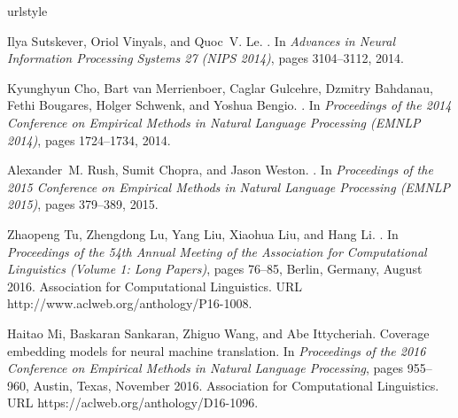\documentclass[11pt]{article}
\begin{document}
\begin{thebibliography}{23}
\providecommand{\natexlab}[1]{#1}
\providecommand{\url}[1]{{#1}}
\expandafter\ifx\csname urlstyle\endcsname\relax
  \providecommand{\doi}[1]{doi: #1}\else
  \providecommand{\doi}{doi: \begingroup \urlstyle{rm}\Url}\fi

Ilya Sutskever, Oriol Vinyals, and Quoc~V. Le.
.
\newblock In \emph{Advances in Neural Information Processing Systems 27 (NIPS
  2014)}, pages 3104--3112, 2014.

Kyunghyun Cho, Bart van Merrienboer, Caglar Gulcehre, Dzmitry Bahdanau, Fethi
  Bougares, Holger Schwenk, and Yoshua Bengio.
.
\newblock In \emph{Proceedings of the 2014 Conference on Empirical Methods in
  Natural Language Processing (EMNLP 2014)}, pages 1724--1734, 2014.

Alexander~M. Rush, Sumit Chopra, and Jason Weston.
.
\newblock In \emph{Proceedings of the 2015 Conference on Empirical Methods in
  Natural Language Processing (EMNLP 2015)}, pages 379--389, 2015.

Zhaopeng Tu, Zhengdong Lu, Yang Liu, Xiaohua Liu, and Hang Li.
.
\newblock In \emph{Proceedings of the 54th Annual Meeting of the Association
  for Computational Linguistics (Volume 1: Long Papers)}, pages 76--85, Berlin,
  Germany, August 2016. Association for Computational Linguistics.
\newblock URL \url{http://www.aclweb.org/anthology/P16-1008}.

Haitao Mi, Baskaran Sankaran, Zhiguo Wang, and Abe Ittycheriah.
\newblock Coverage embedding models for neural machine translation.
\newblock In \emph{Proceedings of the 2016 Conference on Empirical Methods in
  Natural Language Processing}, pages 955--960, Austin, Texas, November 2016.
  Association for Computational Linguistics.
\newblock URL \url{https://aclweb.org/anthology/D16-1096}.


\end{thebibliography}
\end{document}
